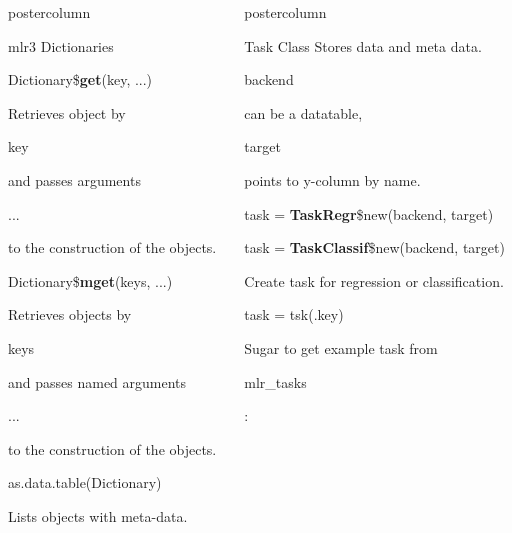 \documentclass{beamer}
\newlength{\columnheight} %
\newcommand{\codeinline}[1]{\begin{codeboxinline}#1\end{codeboxinline}}
\begin{document}
\begin{frame}[fragile]{}
\begin{columns}
\begin{column}{.245\textwidth}
\begin{beamercolorbox}[center]{postercolumn}
\begin{minipage}{.98\textwidth}
{\begin{myblock}{mlr3 Dictionaries}
							\begin{codebox}
								Dictionary\$\textbf{get}(key, ...)
							\end{codebox}
							Retrieves object by \codeinline{key} and 
							passes arguments \codeinline{...} to the construction of the objects.
							\\
							\begin{codebox}
								Dictionary\$\textbf{mget}(keys, ...)
							\end{codebox}
							Retrieves objects by \codeinline{keys} and 
							passes named arguments \codeinline{...} to the construction of the objects. 
							\\
							\begin{codebox}
								as.data.table(Dictionary)
							\end{codebox}
							Lists objects with meta-data.
						\end{myblock}
					\vfill}
				\end{minipage}
			\end{beamercolorbox}
		\end{column}
		\begin{column}{.245\textwidth}
			\begin{beamercolorbox}[center]{postercolumn}
				\begin{minipage}{.98\textwidth}
					\parbox[t][\columnheight]{\textwidth}{
						\begin{myblock}{Task Class}
							Stores data and meta data. \codeinline{backend} can be a datatable, 
                            \codeinline{target} points to y-column by name.
							\\
							\begin{codebox}
								task = \textbf{TaskRegr}\$new(backend, target) 
							\end{codebox}
							\begin{codebox}
								task = \textbf{TaskClassif}\$new(backend, target) 
							\end{codebox}
                            Create task for regression or classification.
                            \\
							\begin{codebox}
                                task = tsk(.key)
							\end{codebox}
                            Sugar to get example task from \codeinline{mlr\_tasks}:
                            \\
                            \begin{itemize}

\end{itemize}
\end{myblock}}
\end{minipage}
\end{beamercolorbox}
\end{column}
\end{columns}
\end{frame}
\end{document}
